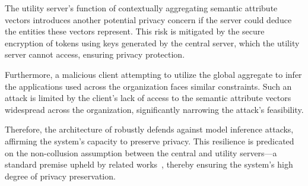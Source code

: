 The utility server's function of contextually aggregating semantic attribute vectors introduces another potential privacy concern if the server could deduce the entities these vectors represent. This risk is mitigated by the secure encryption of tokens using keys generated by the central server, which the utility server cannot access, ensuring privacy protection.

Furthermore, a malicious client attempting to utilize the global aggregate to infer the applications used across the organization faces similar constraints. Such an attack is limited by the client's lack of access to the semantic attribute vectors widespread across the organization, significantly narrowing the attack's feasibility.

Therefore, the architecture of \Sys robustly defends against model inference attacks, affirming the system's capacity to preserve privacy. This resilience is predicated on the non-collusion assumption between the central and utility servers—a standard premise upheld by related works~\cite{roy2020crypte,wu2022federated}, thereby ensuring the system's high degree of privacy preservation.